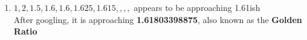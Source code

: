 \documentclass[]{article}
\begin{document}
\begin{enumerate}
\begin{enumerate}
                     \item   $1, 2, 1.5, 1.6, 1.6, 1.625, 1.615,,,,$ appears to be approaching 1.61ish 
                             \\
                             After googling, it is approaching \textbf{1.61803398875}, also known as the \large{\textbf{Golden Ratio}}
                             
             \end{enumerate}
\end{enumerate}
\end{document}
